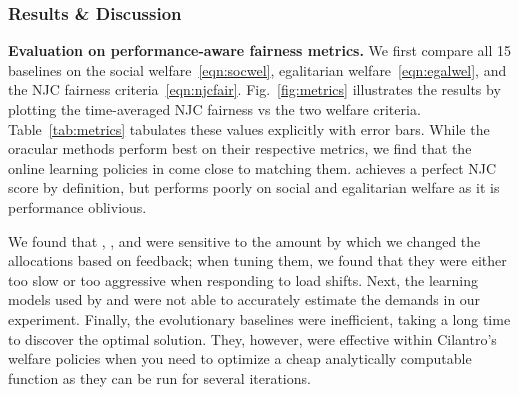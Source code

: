 

\subsubsection{Results \& Discussion}
\label{sec:baselines}

\insertFigMetrics

\insertFigTimeseriesUtilities
\textbf{Evaluation on performance-aware fairness metrics.}
We first compare all 15 baselines on the social
welfare~\eqref{eqn:socwel}, egalitarian welfare~\eqref{eqn:egalwel}, and the NJC fairness
criteria~\eqref{eqn:njcfair}.
% 
Fig.~\ref{fig:metrics} illustrates the results by
plotting the time-averaged NJC fairness vs the two welfare criteria.
Table~\ref{tab:metrics} tabulates these values explicitly with error bars.
While the oracular methods perform best on their respective metrics, we find that the online
learning policies in \cilantros come close to matching them.
\equalshare{} achieves a perfect NJC score by definition, but performs poorly on social and
egalitarian welfare as it is performance oblivious.

We found that
\greedyew, \parties, and \AIMD{} were sensitive to the amount
by which we changed the allocations based on feedback;
when tuning them, we found that they were
either too slow or too aggressive when responding to load shifts.
Next, the learning models used by \quasar{} and \ernest{} were not able to
accurately estimate the demands in our experiment.
Finally,  the evolutionary baselines were inefficient,
taking a long time to discover the optimal solution.
They, however, were effective within Cilantro's welfare policies
when you need to optimize a cheap analytically computable function as they can be run for
several iterations.

% 


\insertFigUserUtilities


